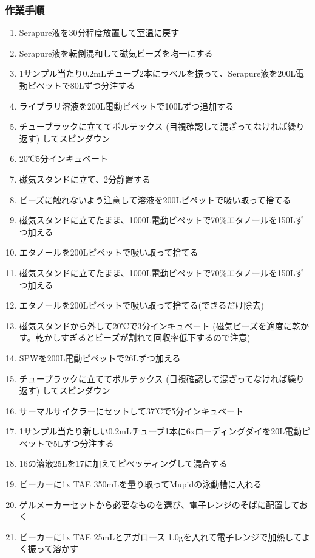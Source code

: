 \documentclass[titlepage,10pt,a4paper,uplatex]{jsbook}
\begin{document}
\subsubsection{作業手順}
\begin{enumerate}
\item Serapure液を30分程度放置して室温に戻す
\item Serapure液を転倒混和して磁気ビーズを均一にする
\item 1サンプル当たり0.2mLチューブ2本にラベルを振って、Serapure液を200{\textmu}L電動ピペットで80{\textmu}Lずつ分注する
\item ライブラリ溶液を200{\textmu}L電動ピペットで100{\textmu}Lずつ追加する
\item チューブラックに立ててボルテックス (目視確認して混ざってなければ繰り返す) してスピンダウン
\item 20℃5分インキュベート
\item 磁気スタンドに立て、2分静置する
\item ビーズに触れないよう注意して溶液を200{\textmu}Lピペットで吸い取って捨てる
\item 磁気スタンドに立てたまま、1000{\textmu}L電動ピペットで70\%エタノールを150{\textmu}Lずつ加える
\item エタノールを200{\textmu}Lピペットで吸い取って捨てる
\item 磁気スタンドに立てたまま、1000{\textmu}L電動ピペットで70\%エタノールを150{\textmu}Lずつ加える
\item エタノールを200{\textmu}Lピペットで吸い取って捨てる(できるだけ除去)
\item 磁気スタンドから外して20℃で3分インキュベート (磁気ビーズを適度に乾かす。乾かしすぎるとビーズが割れて回収率低下するので注意)
\item SPWを200{\textmu}L電動ピペットで26{\textmu}Lずつ加える
\item チューブラックに立ててボルテックス (目視確認して混ざってなければ繰り返す) してスピンダウン
\item サーマルサイクラーにセットして37℃で5分インキュベート
\item 1サンプル当たり新しい0.2mLチューブ1本に6xローディングダイを20{\textmu}L電動ピペットで5{\textmu}Lずつ分注する
\item 16の溶液25{\textmu}Lを17に加えてピペッティングして混合する
\item ビーカーに1x TAE 350mLを量り取ってMupidの泳動槽に入れる
\item ゲルメーカーセットから必要なものを選び、電子レンジのそばに配置しておく
\item ビーカーに1x TAE 25mLとアガロース 1.0gを入れて電子レンジで加熱してよく振って溶かす

\end{enumerate}
\end{document}
